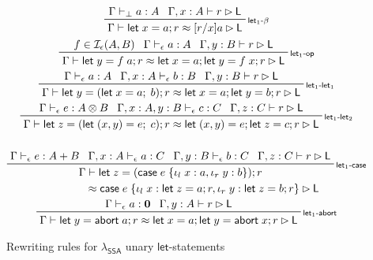 \documentclass[acmsmall,screen,review]{acmart}
\newcommand{\mc}[1]{\ensuremath{\mathcal{#1}}}
\newcommand{\mb}[1]{\ensuremath{\mathbf{#1}}}
\newcommand{\ms}[1]{\ensuremath{\mathsf{#1}}}
\newcommand{\lto}{:}
\newcommand{\linl}[1]{\iota_l\;{#1}}
\newcommand{\linr}[1]{\iota_r\;{#1}}
\newcommand{\labort}[1]{\ms{abort}\;{#1}}
\newcommand{\letexpr}[3]{\ensuremath{\ms{let}\;#1 = #2;\;#3}}
\newcommand{\caseexpr}[5]{\ms{case}\;#1\;\{\linl{#2} \lto #3, \linr{#4} \lto #5\}}
\newcommand{\letstmt}[3]{\ensuremath{\ms{let}\;#1 = #2; #3}}
\newcommand{\casestmt}[5]{\ms{case}\;#1\;\{\linl{#2} \lto #3, \linr{#4} \lto #5\}}
\newcommand{\bhyp}[2]{#1 : #2}
\newcommand{\rle}[1]{{\scriptsize\textsf{#1}}}
\newcommand{\hasty}[4]{#1 \vdash_{#2} #3: {#4}}
\newcommand{\haslb}[3]{#1 \vdash #2 \rhd #3}
\newcommand{\isop}[4]{#1 \in \mc{I}_{#4}(#2, #3)}
\newcommand{\teqv}{\approx}
\newcommand{\lbeq}[4]{#1 \vdash #2 \teqv #3 \rhd {#4}}
\newcommand{\isotopessa}{\(\lambda_{\ms{SSA}}\)}
\begin{document}
\begin{figure}
  \begin{gather*}
    \prftree[r]{\rle{let$_1$-$\beta$}}
      {\hasty{\Gamma}{\bot}{a}{A}}
      {\haslb{\Gamma, \bhyp{x}{A}}{r}{\ms{L}}}
      {\lbeq{\Gamma}{\letstmt{x}{a}{r}}{[r/x]a}{\ms{L}}}
    \\
      \prftree[r]{\rle{let$_1$-op}}
      {\isop{f}{A}{B}{\epsilon}}
      {\hasty{\Gamma}{\epsilon}{a}{A}}
      {\haslb{\Gamma, \bhyp{y}{B}}{r}{\ms{L}}}
      {\lbeq{\Gamma}{\letstmt{y}{f\;a}{r}}{\letstmt{x}{a}{\letstmt{y}{f\;x}{r}}}{\ms{L}}}
    \\
    \prftree[r]{\rle{let$_{1}$-let$_1$}}
      {\hasty{\Gamma}{\epsilon}{a}{A}}
      {\hasty{\Gamma, \bhyp{x}{A}}{\epsilon}{b}{B}}
      {\haslb{\Gamma, \bhyp{y}{B}}{r}{\ms{L}}}
      {\lbeq{\Gamma}{\letstmt{y}{(\letexpr{x}{a}{b})}{r}}{\letstmt{x}{a}{\letstmt{y}{b}{r}}}{\ms{L}}}
    \\
    \prftree[r]{\rle{let$_{1}$-let$_2$}}
      {\hasty{\Gamma}{\epsilon}{e}{A \otimes B}}
      {\hasty{\Gamma, \bhyp{x}{A}, \bhyp{y}{B}}{\epsilon}{c}{C}}
      {\haslb{\Gamma, \bhyp{z}{C}}{r}{\ms{L}}}
      {\lbeq{\Gamma}
        {\letstmt{z}{(\letexpr{(x, y)}{e}{c})}{r}}
        {\letstmt{(x, y)}{e}{\letstmt{z}{c}{r}}}
        {\ms{L}}}
    \\
    \\
    \prftree[r]{\rle{let$_1$-case}}
      {\hasty{\Gamma}{\epsilon}{e}{A + B}}
      {\hasty{\Gamma, \bhyp{x}{A}}{\epsilon}{a}{C}}
      {\hasty{\Gamma, \bhyp{y}{B}}{\epsilon}{b}{C}}
      {\haslb{\Gamma, \bhyp{z}{C}}{r}{\ms{L}}}
      { 
        \prfStackPremises
        {\Gamma \vdash \letstmt{z}{(\caseexpr{e}{x}{a}{y}{b})}{r}}
        {\hspace{6em} \teqv \casestmt{e}{x}{\letstmt{z}{a}{r}}{y}{\letstmt{z}{b}{r}} \rhd \ms{L}}
      }
    \\
    \prftree[r]{\rle{let$_1$-abort}}
      {\hasty{\Gamma}{\epsilon}{a}{\mb{0}}}
      {\haslb{\Gamma, \bhyp{y}{A}}{r}{\ms{L}}}
      {\lbeq{\Gamma}{\letstmt{y}{\labort{a}}{r}}
        {\letstmt{x}{a}{\letstmt{y}{\labort{x}}{r}}}{\ms{L}}}
  \end{gather*}
  \Description{}
  \caption{Rewriting rules for \isotopessa{} unary \ms{let}-statements}
  \label{fig:ssa-reg-unary-let}
\end{figure}
\end{document}
